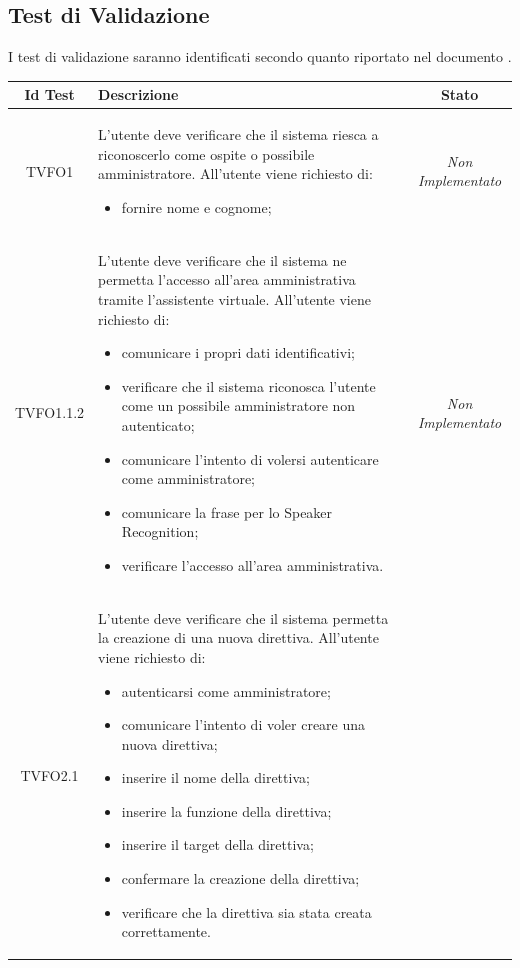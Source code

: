 \subsection{Test di Validazione}
I test di validazione saranno identificati secondo quanto riportato nel documento \NPdoc{}.
\normalsize
\begin{longtable}{|c|>{}m{8cm}|c|}
\hline
\textbf{Id Test} & \textbf{Descrizione} & \textbf{Stato}\\
\hline
\endhead
\hypertarget{TVFO1}{TVFO1} & L'utente deve verificare che il sistema riesca a riconoscerlo come ospite o possibile amministratore. All'utente viene richiesto di:
\begin{itemize}
\item fornire nome e cognome;
\end{itemize} & \textit{Non Implementato}\\ \hline
\hypertarget{TVFO1.1.2}{TVFO1.1.2} & L'utente deve verificare che il sistema ne permetta l'accesso all'area amministrativa tramite l'assistente virtuale. All'utente viene richiesto di:
\begin{itemize}
\item comunicare i propri dati identificativi;
\item verificare che il sistema riconosca l'utente come un possibile amministratore non autenticato;
\item comunicare l'intento di volersi autenticare come amministratore;
\item comunicare la frase per lo Speaker Recognition;
\item verificare l'accesso all'area amministrativa.
\end{itemize} & \textit{Non Implementato}\\ \hline
\hypertarget{TVFO2.1}{TVFO2.1} & L'utente deve verificare che il sistema permetta la creazione di una nuova direttiva. All'utente viene richiesto di:
\begin{itemize}
\item autenticarsi come amministratore;
\item comunicare l'intento di voler creare una nuova direttiva;
\item inserire il nome della direttiva;
\item inserire la funzione della direttiva;
\item inserire il target della direttiva;
\item confermare la creazione della direttiva;
\item verificare che la direttiva sia stata creata correttamente.

\end{itemize}
\end{longtable}
